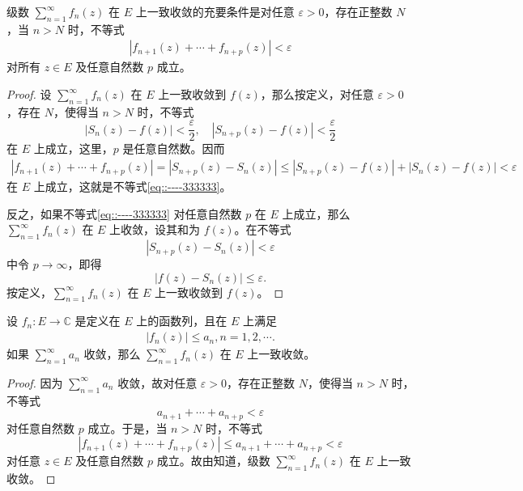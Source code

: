 \documentclass[../../main.tex]{subfiles}%
\begin{document}
\begin{theorem}\label{theorem:定理4.1.2}
级数 \( \sum_{n=1}^{\infty} f_n(z) \) 在 \( E \) 上一致收敛的充要条件是对任意 \( \varepsilon > 0 \)，存在正整数 \( N \)，当 \( n > N \) 时，不等式
\begin{align}
|f_{n + 1}(z) + \cdots + f_{n + p}(z)| < \varepsilon\label{eq::----333333}
\end{align}
对所有 \( z \in E \) 及任意自然数 \( p \) 成立。
\end{theorem}
\begin{proof}

设 \( \sum_{n=1}^{\infty} f_n(z) \) 在 \( E \) 上一致收敛到 \( f(z) \)，那么按定义，对任意 \( \varepsilon > 0 \)，存在 \( N \)，使得当 \( n > N \) 时，不等式
\[
|S_n(z) - f(z)| < \frac{\varepsilon}{2},
\quad
|S_{n + p}(z) - f(z)| < \frac{\varepsilon}{2}
\]
在 \( E \) 上成立，这里，\( p \) 是任意自然数。因而
\begin{align*}
|f_{n + 1}(z) + \cdots + f_{n + p}(z)| = |S_{n + p}(z) - S_n(z)| \leqslant |S_{n + p}(z) - f(z)| + |S_n(z) - f(z)| < \varepsilon
\end{align*}
在 \( E \) 上成立，这就是不等式\eqref{eq::----333333}。

反之，如果不等式\eqref{eq::----333333} 对任意自然数 \( p \) 在 \( E \) 上成立，那么 \( \sum_{n=1}^{\infty} f_n(z) \) 在 \( E \) 上收敛，设其和为 \( f(z) \)。在不等式
\[
|S_{n + p}(z) - S_n(z)| < \varepsilon
\]
中令 \( p \to \infty \)，即得
\[
|f(z) - S_n(z)| \leqslant \varepsilon.
\]
按定义，\( \sum_{n=1}^{\infty} f_n(z) \) 在 \( E \) 上一致收敛到 \( f(z) \)。

\end{proof}

\begin{theorem}[Weierstrass一致收敛判别法]\label{theorem:Weierstrass一致收敛判别法}
设 \( f_n: E \to \mathbb{C} \) 是定义在 \( E \) 上的函数列，且在 \( E \) 上满足
\begin{align*}
|f_n(z)| \leqslant a_n, n = 1, 2, \cdots .
\end{align*}
如果 \( \sum_{n=1}^{\infty} a_n \) 收敛，那么 \( \sum_{n=1}^{\infty} f_n(z) \) 在 \( E \) 上一致收敛。
\end{theorem}
\begin{proof}

因为 \( \sum_{n=1}^{\infty} a_n \) 收敛，故对任意 \( \varepsilon > 0 \)，存在正整数 \( N \)，使得当 \( n > N \) 时，不等式
\[
a_{n + 1} + \cdots + a_{n + p} < \varepsilon
\]
对任意自然数 \( p \) 成立。于是，当 \( n > N \) 时，不等式
\[
|f_{n + 1}(z) + \cdots + f_{n + p}(z)| \leqslant a_{n + 1} + \cdots + a_{n + p}
< \varepsilon
\]
对任意 \( z \in E \) 及任意自然数 \( p \) 成立。故由知道，级数 \( \sum_{n=1}^{\infty} f_n(z) \) 在 \( E \) 上一致收敛。

\end{proof}
\end{document}

